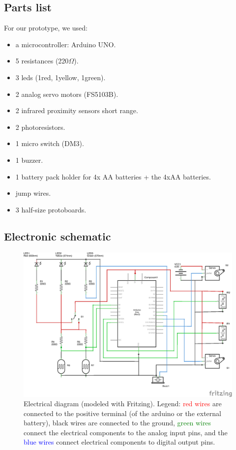 \subsection{Parts list}
For our prototype, we used:
\begin{itemize}
	\item a microcontroller: Arduino UNO.
	\item 5 resistances (220$\Omega$).
    \item 3 leds (1red, 1yellow, 1green).
    \item 2 analog servo motors (FS5103B).
    \item 2 infrared proximity sensors short range.
    \item 2 photoresistors.
    \item 1 micro switch (DM3).
    \item 1 buzzer.
    \item 1 battery pack holder for 4x AA batteries + the 4xAA batteries.
    \item jump wires.
    \item 3 half-size protoboards.
\end{itemize}

\subsection{Electronic schematic}

\begin{figure}[!h]
	\centering
    \includegraphics[scale=1]{ElectronicScheme1.png}
    \caption{Electrical diagram (modeled with Fritzing). Legend: \textcolor{red}{red wires} are connected to the positive terminal (of the arduino or the external battery), black wires are connected to the ground, \textcolor{green}{green wires} connect the electrical components to the analog input pins, and the \textcolor{blue}{blue wires} connect electrical components to digital output pins.}
    \label{elecScheme}
\end{figure}


